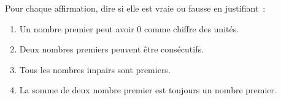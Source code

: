 \documentclass[exercice]{thedocument}%
\begin{document}
%
Pour chaque affirmation, dire si elle est vraie ou fausse en justifiant~:
\begin{enumerate}
    \item Un nombre premier peut avoir 0 comme chiffre des unités.
    \item Deux nombres premiers peuvent être consécutifs.
    \item Tous les nombres impairs sont premiers.
    \item La somme de deux nombre premier est toujours un nombre premier.
\end{enumerate}
\end{document}
